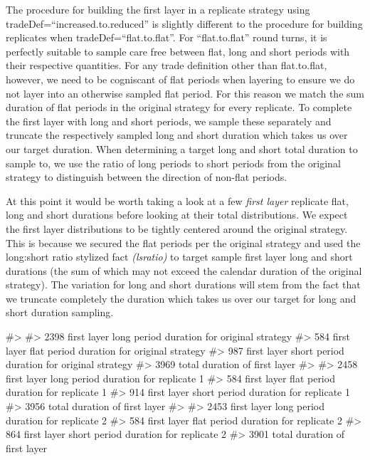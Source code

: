 The procedure for building the first layer in a replicate strategy using
tradeDef=``increased.to.reduced'' is slightly different to the procedure
for building replicates when tradeDef=``flat.to.flat''. For
``flat.to.flat'' round turns, it is perfectly suitable to sample care
free between flat, long and short periods with their respective
quantities. For any trade definition other than flat.to.flat, however,
we need to be cogniscant of flat periods when layering to ensure we do
not layer into an otherwise sampled flat period. For this reason we
match the sum duration of flat periods in the original strategy for
every replicate. To complete the first layer with long and short
periods, we sample these separately and truncate the respectively
sampled long and short duration which takes us over our target duration.
When determining a target long and short total duration to sample to, we
use the ratio of long periods to short periods from the original
strategy to distinguish between the direction of non-flat periods.

At this point it would be worth taking a look at a few \emph{first
layer} replicate flat, long and short durations before looking at their
total distributions. We expect the first layer distributions to be
tightly centered around the original strategy. This is because we
secured the flat periods per the original strategy and used the
long:short ratio stylized fact \emph{(lsratio)} to target sample first
layer long and short durations (the sum of which may not exceed the
calendar duration of the original strategy). The variation for long and
short durations will stem from the fact that we truncate completely the
duration which takes us over our target for long and short duration
sampling.

\begin{Schunk}
\begin{Soutput}
#> 
#>  2398 first layer long period duration for original strategy 
#>  584 first layer flat period duration for original strategy 
#>  987 first layer short period duration for original strategy 
#>  3969 total duration of first layer 
#>  
#>  2458 first layer long period duration for replicate 1 
#>  584 first layer flat period duration for replicate 1 
#>  914 first layer short period duration for replicate 1 
#>  3956 total duration of first layer 
#>  
#>  2453 first layer long period duration for replicate 2 
#>  584 first layer flat period duration for replicate 2 
#>  864 first layer short period duration for replicate 2 
#>  3901 total duration of first layer
\end{Soutput}
\end{Schunk}

